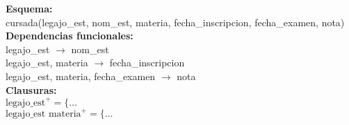 \documentclass[preview]{standalone}
\begin{document}
\textbf{Esquema:}\\
cursada(legajo\_est, nom\_est, materia, fecha\_inscripcion, fecha\_examen, nota)\\

\textbf{Dependencias funcionales:}\\
legajo\_est $\rightarrow$ nom\_est\\
legajo\_est, materia $\rightarrow$ fecha\_inscripcion\\
legajo\_est, materia, fecha\_examen $\rightarrow$ nota\\

\textbf{Clausuras:}\\
$\text{legajo\_est}^+ = \big\{\dots$\\
$\text{legajo\_est materia}^+ = \big\{\dots$
\end{document}
